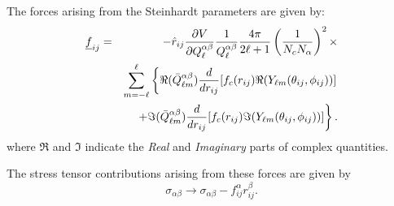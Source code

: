 The forces arising from the Steinhardt parameters are given by:
\begin{eqnarray}
\mbox{$\underline{f}$}_{ij}&=&-\hat{r}_{ij}\frac{\partial V}{\partial Q_{\ell}^{\alpha\beta}}
\frac{1}{Q_{\ell}^{\alpha\beta}}\frac{4\pi}{2\ell+1}\left
  (\frac{1}{N_{c}N_{\alpha}} \right )^{2}\times \nonumber \\
 & & \sum_{m=-\ell}^{\ell} \left \{\Re (\bar{Q}_{\ell m}^{\alpha\beta})
\frac{d}{dr_{ij}}[f_{c}(r_{ij}) \Re (Y_{\ell m}(\theta_{ij},\phi_{ij}))]
\right . \nonumber \\
 & & \left . +\Im (\bar{Q}_{\ell m}^{\alpha\beta}) 
\frac{d}{dr_{ij}}[f_{c}(r_{ij}) 
\Im (Y_{\ell m}(\theta_{ij},\phi_{ij}))]\right \}. \label{stein4}
\end{eqnarray}
where $\Re$ and $\Im$ indicate the {\em Real} and {\em Imaginary} parts of
complex quantities.

The stress tensor contributions arising from these forces are given by
\begin{equation}
\sigma_{\alpha\beta} \rightarrow
\sigma_{\alpha\beta}-f_{ij}^{\alpha}r_{ij}^{\beta}.
\end{equation}

